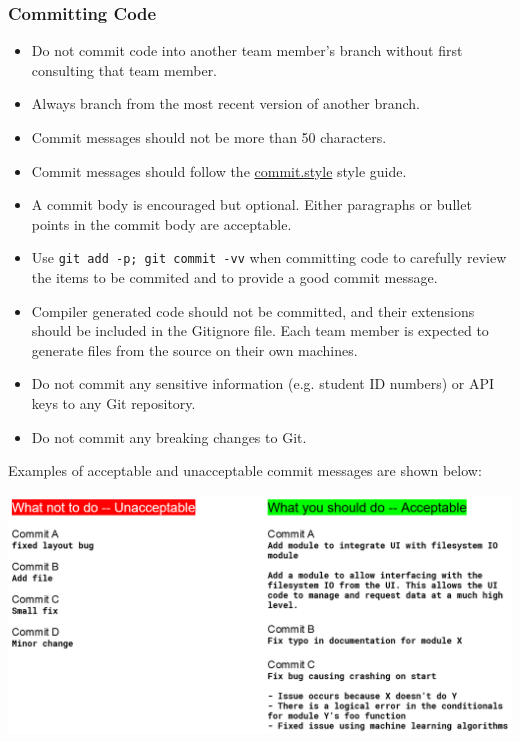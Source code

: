 \documentclass{article}
\begin{document}
\subsubsection{Committing Code}
\begin{itemize}
\item Do not commit code into another team member's branch without first consulting that team member.
\item Always branch from the most recent version of another branch.
\item Commit messages should not be more than 50 characters.
\item Commit messages should follow the \href{https://commit.style}{commit.style} style guide.
\item A commit body is encouraged but optional. Either paragraphs or bullet points in the commit body are acceptable.
\item Use \texttt{git add -p; git commit -vv} when committing code to carefully review the items to be commited and to provide a good commit message.
\item Compiler generated code should not be committed, and their extensions should be included in the Gitignore file. Each team member is expected to generate files from the source on their own machines.
\item Do not commit any sensitive information (e.g. student ID numbers) or API keys to any Git repository.
\item Do not commit any breaking changes to Git.
\end{itemize}

Examples of acceptable and unacceptable commit messages are shown below:

\includegraphics{git-example.png}
\end{document}
